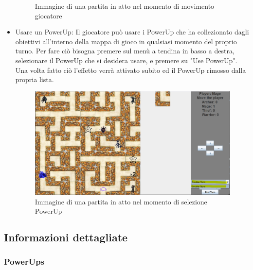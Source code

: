 \documentclass[a4paper,12pt]{report}
\begin{document}
\begin{itemize}
\begin{figure}[H]
		\caption{Immagine di una partita in atto nel momento di movimento giocatore}
		\label{img:Partita in atto}
	\end{figure}
	\item Usare un PowerUp: Il giocatore può usare i PowerUp che ha collezionato dagli obiettivi all'interno della mappa di gioco in qualsiasi momento del proprio 
	turno. Per fare ciò bisogna premere sul menù a tendina in basso a destra, selezionare il PowerUp che si desidera usare, e premere su "Use PowerUp". Una volta fatto ciò 
	l'effetto verrà attivato subito ed il PowerUp rimosso dalla propria lista.
	\begin{figure}[H]
		\includegraphics[width=\textwidth]{img/PowerUpMenu.png}
		\caption{Immagine di una partita in atto nel momento di selezione PowerUp}
		\label{img:Power Up Menu}
	\end{figure}
\end{itemize}

\subsection*{Informazioni dettagliate}

\subsubsection*{PowerUps}
\end{document}
